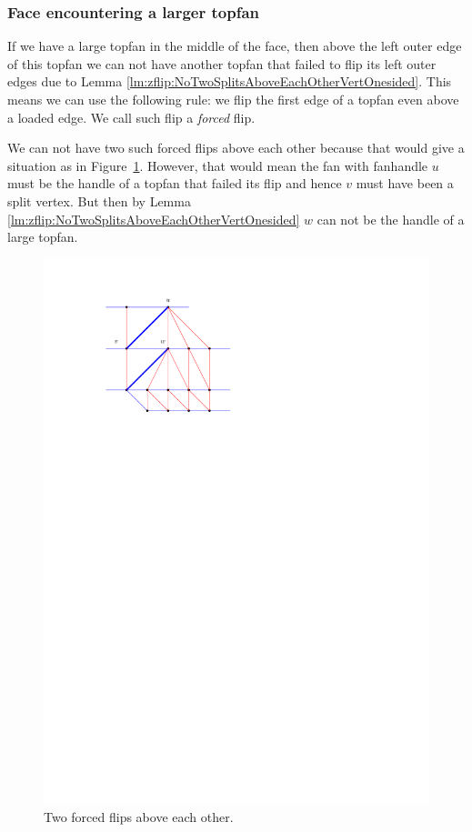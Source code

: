 \subsubsection{Face encountering a larger topfan}
  If we have a large topfan in the middle of the face, then above the left outer edge of this topfan we can not have another topfan that failed to flip its left outer edges due to Lemma \ref{lm:zflip:NoTwoSplitsAboveEachOtherVertOnesided}.
  This means we can use the following rule: we flip the first edge of a topfan even above a loaded edge.
  We call such flip a \emph{forced} flip.

  We can not have two such forced flips above each other because that would give a situation as in Figure~\ref{fig:subdiv:forcedFlips}.
  However, that would mean the fan with fanhandle $u$ must be the handle of a topfan that failed its flip and hence $v$ must have been a split vertex. But then by Lemma \ref{lm:zflip:NoTwoSplitsAboveEachOtherVertOnesided} $w$ can not be the handle of a large topfan.

  \begin{figure}[t]
    \centering
    \includegraphics[scale=1]{blueFaceSubdivision/img/forcedFlips.pdf}
    \caption{Two forced flips above each other.}
    \label{fig:subdiv:forcedFlips}
  \end{figure}

